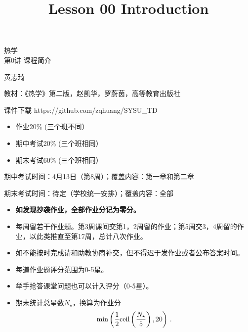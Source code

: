 \documentclass[CJK]{beamer}
\title{Lesson 00 Introduction}
\author{}
\date{}
\begin{document}
\begin{frame}
\begin{center}
\begin{Large}
\bch
热学 \\
第0讲 课程简介

{\vskip 0.3in}

黄志琦

\ech
\end{Large}
\end{center}

\vskip 0.2in

\bch
教材：《热学》第二版，赵凯华，罗蔚茵，高等教育出版社
\ech

\bch
课件下载
\ech
https://github.com/zqhuang/SYSU\_TD
\end{frame}




\begin{frame}
\bch

\begin{itemize}
\item{作业20\% (三个班不同）}
\item{期中考试20\% (三个班相同）}
\item{期末考试60\% (三个班相同）}
\end{itemize}

\skipline

期中考试时间：4月13日（第8周）；覆盖内容：第一章和第二章

期末考试时间：待定（学校统一安排）；覆盖内容：全部
\ech
\end{frame}


\begin{frame}
\bch
\begin{itemize}
\item{{\bf 如发现抄袭作业，全部作业分记为零分。}}
\item{每周留若干作业题。第3周课间交第1，2周留的作业；第5周交3，4周留的作业，以此类推直至第17周，总计八次作业。}
\item{如不能按时完成请和助教协商补交，但不得迟于发作业或者公布答案时间。}
\item{每道作业题评分范围为0-5星。}
\item{举手抢答课堂问题也可以计入评分（0-5星）。}
\item{期末统计总星数$N_\star$，换算为作业分
$$ \min\left( \frac{1}{2}{\rm ceil}\left(\frac{N_\star}{5}\right), 20\right) \, . $$}
\end{itemize}

\ech
\end{frame}
\end{document}
